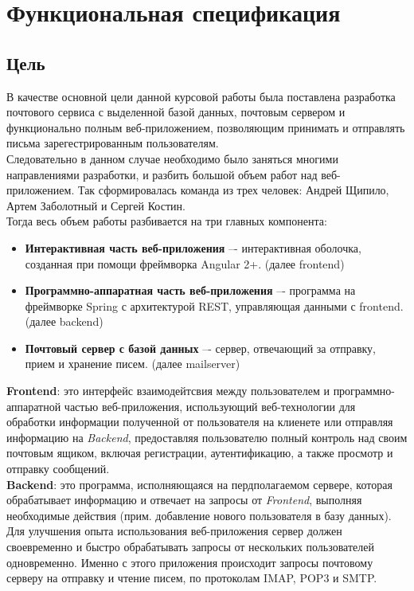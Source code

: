\documentclass{article}
\begin{document}
\newpage
\tableofcontents
\newpage

\section{Функциональная спецификация}
\subsection{Цель}
В качестве основной цели данной курсовой работы была поставлена разработка почтового сервиса с выделенной базой данных, почтовым сервером и функционально полным веб-приложением, позволяющим принимать и отправлять письма зарегестрированным пользователям. \\

Следовательно в данном случае необходимо было заняться многими направлениями разработки, и разбить большой объем работ над веб-приложением. Так сформировалась команда из трех человек: Андрей Щипило, Артем Заболотный и Сергей Костин. \\

Тогда весь объем работы разбивается на три главных компонента: 
\begin{itemize}
	\item \textbf{Интерактивная часть веб-приложения} –- интерактивная оболочка, созданная при помощи фреймворка Angular 2+. (далее frontend)

	\item \textbf{Программно-аппаратная часть веб-приложения} –- программа на фреймворке Spring с архитектурой REST, управляющая данными с frontend. (далее backend)

	\item \textbf{Почтовый сервер с базой данных} –- сервер, отвечающий за отправку, прием и хранение писем. (далее mailserver)
\end{itemize}


\textbf{Frontend}: это интерфейс взаимодейтсвия между пользователем и программно-аппаратной частью веб-приложения, использующий веб-технологии для обработки информации полученной от пользователя на клиенете или отправляя информацию на \emph{Backend}, предоставляя пользователю полный контроль над своим почтовым ящиком, включая регистрации, аутентификацию, а также просмотр и отправку сообщений. \\

\textbf{Backend}: это программа, исполняющаяся на пердполагаемом сервере, которая обрабатывает информацию и отвечает на запросы от \emph{Frontend}, выполняя необходимые действия (прим. добавление нового пользователя в базу данных). Для улучшения опыта использования веб-приложения сервер должен своевременно и быстро обрабатывать запросы от нескольких пользователей одновременно. Именно с этого приложения происходит запросы почтовому серверу на отправку и чтение писем, по протоколам IMAP, POP3 и SMTP. \\
\end{document}
